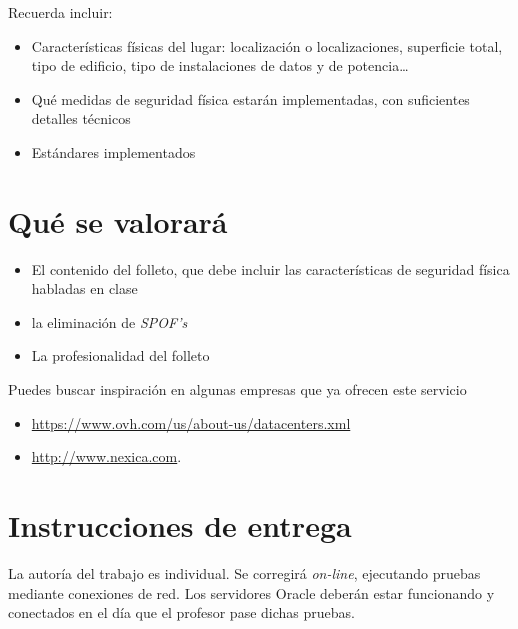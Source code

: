 Recuerda incluir:
\begin{itemize}
\item Características físicas del lugar: localización o localizaciones, superficie total, tipo de edificio, tipo de instalaciones de datos y de potencia…
\item Qué medidas de seguridad física estarán implementadas, con suficientes detalles técnicos
\item Estándares implementados
\end{itemize}

\section{Qué se valorará}
\begin{itemize}
\item El contenido del folleto, que debe incluir las características de seguridad física habladas en clase
\item la eliminación de \textit{SPOF's}
\item La profesionalidad del folleto
\end{itemize}

Puedes buscar inspiración en algunas empresas que ya ofrecen este servicio
\begin{itemize}
\item \url{https://www.ovh.com/us/about-us/datacenters.xml} 
\item \url{http://www.nexica.com}.
\end{itemize}

\section{Instrucciones de entrega}
La autoría del trabajo es individual. Se corregirá \textit{on-line}, ejecutando pruebas mediante conexiones de red. Los servidores Oracle deberán estar funcionando y conectados en el día que el profesor pase dichas pruebas.










